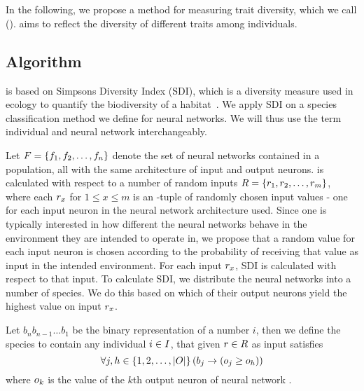 \section{\di{}}\label{sec:nntd}
In the following, we propose a method for measuring trait diversity, which we call \emph{\di{}} (\dia). \dia{} aims to reflect the diversity of different traits among individuals. 

\subsection{Algorithm}
\dia{} is based on Simpsons Diversity Index (SDI), which is a diversity measure used in ecology to quantify the biodiversity of a habitat~\cite{simpson1949measurement}. We apply SDI on a species classification method we define for neural networks. We will thus use the term individual and neural network interchangeably.

Let $F = \left\{ f_1, f_2, \dots, f_n \right\}$ denote the set of neural networks contained in a population, all with the same architecture of \nninsetl{} input and \nnoutsetl{} output neurons. \dia{} is calculated with respect to a number of random inputs $R = \left\{ r_1, r_2, \dots, r_m \right\}$, where each $r_x$ for $1 \leq x \leq m$ is an \nninsetl-tuple of randomly chosen input values - one for each input neuron in the neural network architecture used.
Since one is typically interested in how different the neural networks behave in the environment they are intended to operate in, we propose that a random value for each input neuron is chosen according to the probability of receiving that value as input in the intended environment. For each input $r_x$, SDI is calculated with respect to that input.
To calculate SDI, we distribute the neural networks into a number of species.
We do this based on which of their output neurons yield the highest value on input $r_x$. 

Let $b_{n}b_{n-1}\dots b_1$ be the binary representation of a number $i$,
then we define the species  to contain any individual $i \in I$, that given $r \in R$ as input satisfies
%
\begin{equation}\label{eq:nntdbucket}
  \forall j, h \in \left\{ 1, 2, \dots, \lvert O\rvert \right\} \left(b_j \rightarrow \left(o_j \geq o_h\right)\right)
\end{equation}
%
where $o_k$ is the value of the $k$th output neuron of neural network \ind.

